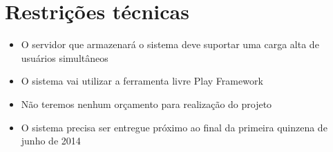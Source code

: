 \documentclass[12pt, a4paper]{article}
\begin{document}
    \section{Restrições técnicas}
    \begin{itemize}
        \item
        O servidor que armazenará o sistema deve suportar uma carga alta de
        usuários simultâneos
        \item
        O sistema vai utilizar a ferramenta livre Play Framework
        \item
        Não teremos nenhum orçamento para realização do projeto
        \item
        O sistema precisa ser entregue próximo ao final da primeira quinzena de
        junho de 2014
    \end{itemize}
\end{document}
